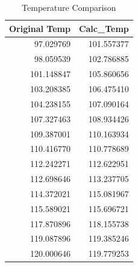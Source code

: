 \begin{table}[ht]
\centering
\caption{Temperature Comparison}
\begin{adjustbox}{max width=\textwidth}
\begin{tabular}{|r|r|}
\hline
 Original Temp &   Calc\_Temp \\ \hline
     97.029769 &  101.557377 \\ \hline
     98.059539 &  102.786885 \\ \hline
    101.148847 &  105.860656 \\ \hline
    103.208385 &  106.475410 \\ \hline
    104.238155 &  107.090164 \\ \hline
    107.327463 &  108.934426 \\ \hline
    109.387001 &  110.163934 \\ \hline
    110.416770 &  110.778689 \\ \hline
    112.242271 &  112.622951 \\ \hline
    112.698646 &  113.237705 \\ \hline
    114.372021 &  115.081967 \\ \hline
    115.589021 &  115.696721 \\ \hline
    117.870896 &  118.155738 \\ \hline
    119.087896 &  119.385246 \\ \hline
    120.000646 &  119.779253 \\ \hline
\end{tabular}
\label{tab:temp_comp}
\end{adjustbox}
\end{table}


